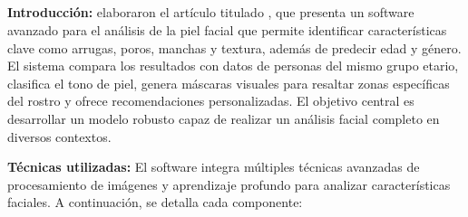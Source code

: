 \subsection{}

\textbf{Introducción:}
\cite{Tamilkodi2024} elaboraron el artículo titulado , que presenta un software avanzado para el análisis de la piel facial que permite identificar características clave como arrugas, poros, manchas y textura, además de predecir edad y género. El sistema compara los resultados con datos de personas del mismo grupo etario, clasifica el tono de piel, genera máscaras visuales para resaltar zonas específicas del rostro y ofrece recomendaciones personalizadas. El objetivo central es desarrollar un modelo robusto capaz de realizar un análisis facial completo en diversos contextos.  

\textbf{Técnicas utilizadas:}
El software integra múltiples técnicas avanzadas de procesamiento de imágenes y aprendizaje profundo para analizar características faciales. A continuación, se detalla cada componente:

